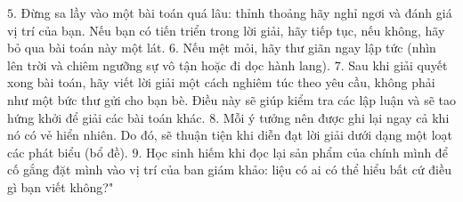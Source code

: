 \begin{multicols}{2}
	\vskip 0.1cm
	$5.$ Đừng sa lầy vào một bài toán quá lâu: thỉnh thoảng hãy nghỉ ngơi và đánh giá vị trí của bạn. Nếu bạn có tiến triển trong lời giải, hãy tiếp tục, nếu không, hãy bỏ qua bài toán này một lát.
	\vskip 0.1cm
	$6.$ Nếu mệt mỏi, hãy thư giãn ngay lập tức (nhìn lên trời và chiêm ngưỡng sự vô tận hoặc đi dọc hành lang).
	\vskip 0.1cm
	$7.$ Sau khi giải quyết xong bài toán, hãy viết lời giải một cách nghiêm túc theo yêu cầu, không phải như một bức thư gửi cho bạn bè. Điều này sẽ giúp kiểm tra các lập luận và sẽ tao hứng khởi để giải các bài toán khác.
	\vskip 0.1cm
	$8.$ Mỗi ý tưởng nên được ghi lại ngay cả khi nó có vẻ hiển nhiên. Do đó, sẽ thuận tiện khi diễn đạt lời giải dưới dạng một loạt các phát biểu (bổ đề).
	\vskip 0.1cm
	$9.$ Học sinh hiếm khi đọc lại sản phẩm của chính mình để cố gắng đặt mình vào vị trí của ban giám khảo: liệu có ai có thể hiểu bất cứ điều gì bạn viết không?"
	\vskip 0.1cm

\end{multicols}
